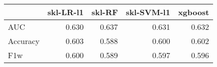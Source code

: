 \begin{tabular}{lrrrr}
\toprule
{} &  skl-LR-l1 &  skl-RF &  skl-SVM-l1 &  xgboost \\
\midrule
AUC      &      0.630 &   0.637 &       0.631 &    0.632 \\
Accuracy &      0.603 &   0.588 &       0.600 &    0.602 \\
F1w      &      0.600 &   0.589 &       0.597 &    0.596 \\
\bottomrule
\end{tabular}
